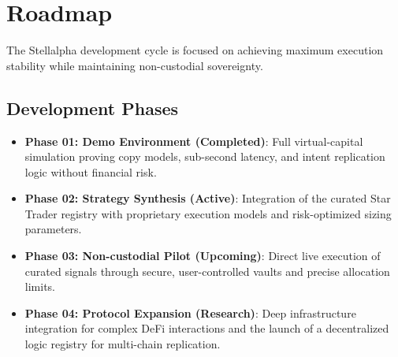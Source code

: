 \section{Roadmap}

The Stellalpha development cycle is focused on achieving maximum execution stability while maintaining non-custodial sovereignty.

\subsection{Development Phases}

\begin{itemize}
  \item \textbf{Phase 01: Demo Environment (Completed)}: Full virtual-capital simulation proving copy models, sub-second latency, and intent replication logic without financial risk.
  \item \textbf{Phase 02: Strategy Synthesis (Active)}: Integration of the curated Star Trader registry with proprietary execution models and risk-optimized sizing parameters.
  \item \textbf{Phase 03: Non-custodial Pilot (Upcoming)}: Direct live execution of curated signals through secure, user-controlled vaults and precise allocation limits.
  \item \textbf{Phase 04: Protocol Expansion (Research)}: Deep infrastructure integration for complex DeFi interactions and the launch of a decentralized logic registry for multi-chain replication.
\end{itemize}
